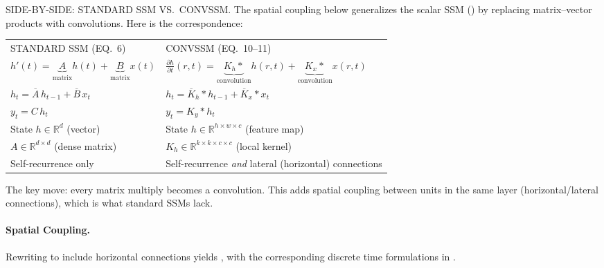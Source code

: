 \begin{ThomasAnnotation}
SIDE-BY-SIDE: STANDARD SSM VS.\ CONVSSM. The spatial coupling below generalizes the scalar SSM () by replacing matrix--vector products with convolutions. Here is the correspondence:

\medskip
\begin{tabular}{@{}l@{\qquad$\longrightarrow$\qquad}l@{}}
STANDARD SSM (EQ.~6) & CONVSSM (EQ.~10--11) \\[4pt]
$h'(t) = \underbrace{A}_{\text{matrix}} h(t) + \underbrace{B}_{\text{matrix}} x(t)$
  & $\frac{\partial h}{\partial t}(r,t) = \underbrace{K_h \ast}_{\text{convolution}} h(r,t) + \underbrace{K_x \ast}_{\text{convolution}} x(r,t)$ \\[6pt]
$h_t = \overline{A}\, h_{t-1} + \overline{B}\, x_t$
  & $h_t = \overline{K}_h \ast h_{t-1} + \overline{K}_x \ast x_t$ \\[6pt]
$y_t = C\, h_t$
  & $y_t = K_y \ast h_t$ \\[4pt]
State $h \in \mathbb{R}^d$ (vector)
  & State $h \in \mathbb{R}^{h \times w \times c}$ (feature map) \\[2pt]
$A \in \mathbb{R}^{d \times d}$ (dense matrix)
  & $K_h \in \mathbb{R}^{k \times k \times c \times c}$ (local kernel) \\[2pt]
Self-recurrence only
  & Self-recurrence \emph{and} lateral (horizontal) connections
\end{tabular}

\medskip
The key move: every matrix multiply becomes a convolution. This adds spatial coupling between units in the same layer (horizontal/lateral connections), which is what standard SSMs lack.
\end{ThomasAnnotation}

\paragraph{Spatial Coupling.} Rewriting  to include horizontal connections yields , with the corresponding discrete time formulations in .

